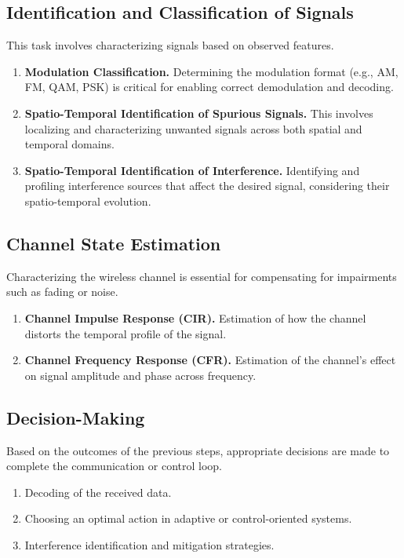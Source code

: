 \documentclass[14pt]{book}
\begin{document}
\subsection{Identification and Classification of Signals}
This task involves characterizing signals based on observed features.

\begin{enumerate}
	\item \textbf{Modulation Classification.} Determining the modulation format (e.g., AM, FM, QAM, PSK) is critical for enabling correct demodulation and decoding.
	
	\item \textbf{Spatio-Temporal Identification of Spurious Signals.} This involves localizing and characterizing unwanted signals across both spatial and temporal domains.
	
	\item \textbf{Spatio-Temporal Identification of Interference.} Identifying and profiling interference sources that affect the desired signal, considering their spatio-temporal evolution.
\end{enumerate}

\subsection{Channel State Estimation}
Characterizing the wireless channel is essential for compensating for impairments such as fading or noise.

\begin{enumerate}
	\item \textbf{Channel Impulse Response (CIR).} Estimation of how the channel distorts the temporal profile of the signal.
	
	\item \textbf{Channel Frequency Response (CFR).} Estimation of the channel's effect on signal amplitude and phase across frequency.
\end{enumerate}

\subsection{Decision-Making}
Based on the outcomes of the previous steps, appropriate decisions are made to complete the communication or control loop.

\begin{enumerate}
	\item Decoding of the received data.
	\item Choosing an optimal action in adaptive or control-oriented systems.
	\item Interference identification and mitigation strategies.
\end{enumerate}
\end{document}
